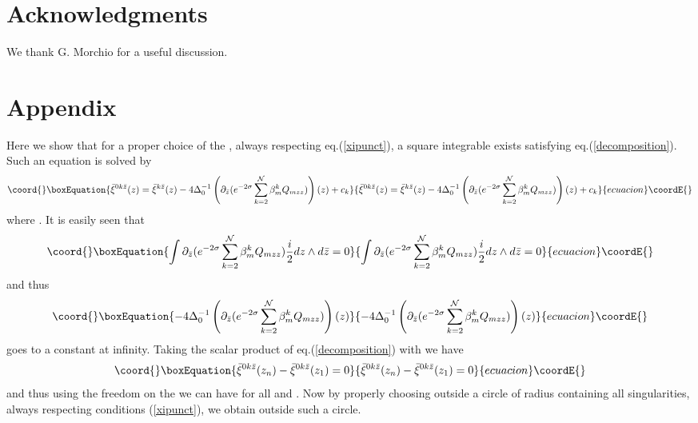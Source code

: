 \documentclass[a4paper,12pt]{article}
\begin{document}
\section*{Acknowledgments}

We thank G. Morchio for a useful discussion.


\section*{Appendix}

Here we show that for a proper choice of the \coordHE{}, always
respecting eq.(\ref{xipunct}), a square integrable \coordHE{}
exists satisfying eq.(\ref{decomposition}). Such an equation is solved by 
\begin{equation}\coord{}\boxEquation{
\bar\xi^{0k\bar z } (z) =  \bar\xi^{k\bar z} (z) -4\Delta_0^{-1}
\left( \partial_{\bar z}(e^{-2\sigma} \sum_{k=2}^{\cal N} \beta^k_m
Q_{mzz})\right)(z) +c_k   
}{
\bar\xi^{0k\bar z } (z) =  \bar\xi^{k\bar z} (z) -4\Delta_0^{-1}
\left( \partial_{\bar z}(e^{-2\sigma} \sum_{k=2}^{\cal N} \beta^k_m
Q_{mzz})\right)(z) +c_k   
}{ecuacion}\coordE{}\end{equation}  
where \coordHE{}.
It is easily seen that 
\begin{equation}\coord{}\boxEquation{
\int \partial_{\bar z}(e^{-2\sigma} \sum_{k=2}^{\cal N} \beta^k_m
Q_{mzz})\frac{i}{2} dz\wedge d\bar z =0
}{
\int \partial_{\bar z}(e^{-2\sigma} \sum_{k=2}^{\cal N} \beta^k_m
Q_{mzz})\frac{i}{2} dz\wedge d\bar z =0
}{ecuacion}\coordE{}\end{equation}  
and thus
\begin{equation}\coord{}\boxEquation{
-4\Delta_0^{-1}
\left( \partial_{\bar z}(e^{-2\sigma} \sum_{k=2}^{\cal N} \beta^k_m
Q_{mzz})\right)(z)
}{
-4\Delta_0^{-1}
\left( \partial_{\bar z}(e^{-2\sigma} \sum_{k=2}^{\cal N} \beta^k_m
Q_{mzz})\right)(z)
}{ecuacion}\coordE{}\end{equation}  
goes to a constant at infinity. Taking the scalar product of
eq.(\ref{decomposition}) with \coordHE{} we have
\begin{equation}\coord{}\boxEquation{
\bar\xi^{0k\bar z } (z_n) -\bar\xi^{0k\bar z } (z_1) =0
}{
\bar\xi^{0k\bar z } (z_n) -\bar\xi^{0k\bar z } (z_1) =0
}{ecuacion}\coordE{}\end{equation}  
and thus using the freedom on the \coordHE{} we can have \coordHE{} for all \coordHE{} and \coordHE{}. Now by properly choosing \coordHE{} outside a circle of radius \coordHE{} containing all singularities,
always respecting conditions  
(\ref{xipunct}), we obtain \coordHE{} outside such a circle.
\end{document}
